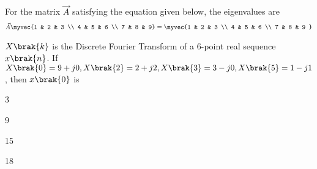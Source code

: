     \item For the matrix $\vec{A}$ satisfying the equation given below, the eigenvalues are
    \begin{align*}
        \vec{A}\myvec{1 & 2 & 3 \\ 4 & 5 & 6 \\ 7 & 8 & 9}
         = \myvec{1 & 2 & 3 \\ 4 & 5 & 6 \\ 7 & 8 & 9 }
    \end{align*}
    \hfill{}
        \begin{enumerate}
    \begin{multicols}{2}
            \item {}
            \item {}
            \item {}
            \item {}
    \end{multicols}
        \end{enumerate}
    \item $X\brak{k}$ is the Discrete Fourier Transform of a 6-point real sequence $x\brak{n}$. If $X\brak{0} = 9+j0, X\brak{2} = 2+j2, X\brak{3} = 3-j0, X\brak{5} = 1-j1$, then $x\brak{0}$ is
    \hfill{}
        \begin{enumerate}
    \begin{multicols}{4}
            \item 3
            \item 9
            \item 15
            \item 18
    \end{multicols}
        \end{enumerate}

